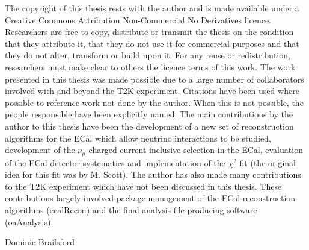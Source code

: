 \begin{declaration}
The copyright of this thesis rests with the author and is made available under a Creative Commons Attribution Non-Commercial No Derivatives licence. Researchers are free to copy, distribute or transmit the thesis on the condition that they attribute it, that they do not use it for commercial purposes and that they do not alter, transform or build upon it. For any reuse or redistribution, researchers must make clear to others the licence terms of this work.
\newline
\newline
The work presented in this thesis was made possible due to a large number of collaborators involved with and beyond the T2K experiment.  Citations have been used where possible to reference work not done by the author.  When this is not possible, the people responsible have been explicitly named.
\newline
\newline
The main contributions by the author to this thesis have been the development of a new set of reconstruction algorithms for the ECal which allow neutrino interactions to be studied, development of the $\nu_\mu$ charged current inclusive selection in the ECal, evaluation of the ECal detector systematics and implementation of the $\chi^2$ fit (the original idea for this fit was by M. Scott).
\newline
\newline
The author has also made many contributions to the T2K experiment which have not been discussed in this thesis.  These contributions largely involved package management of the ECal reconstruction algorithms (ecalRecon) and the final analysis file producing software (oaAnalysis).
  \vspace*{1cm}
  \begin{flushright}
    Dominic Brailsford
  \end{flushright}
\end{declaration}


